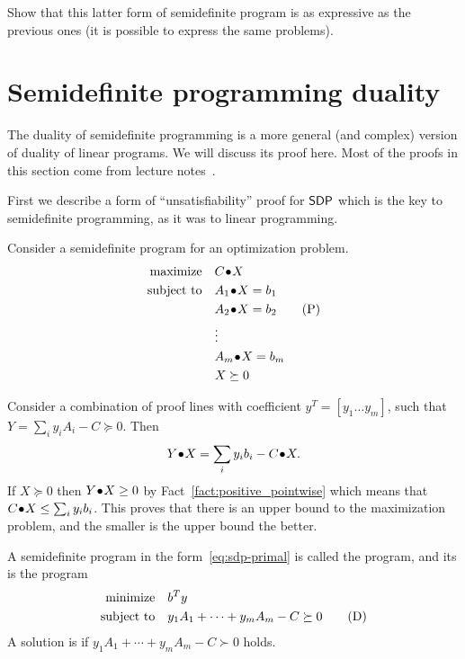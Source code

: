 \documentclass[a4paper,twoside,justified]{tufte-handout}
\begin{document}
\begin{exercise}
  Show that this latter form of semidefinite program is as expressive
  as the previous ones (\ie it is possible to express the same
  problems).
\end{exercise}

\section{Semidefinite programming duality}

The duality of semidefinite programming is a more general (and
complex) version of duality of linear programs. We will discuss its
proof here. Most of the proofs in this section come from \Lovasz
lecture notes~\cite{lovasz2003semidefinite}.


First we describe a form of ``unsatisfiability'' proof for $ \mathsf{SDP} $
which is the key to semidefinite programming, as it was to linear
programming.

Consider a semidefinite program for an optimization problem. 
\begin{alignat}{2}
  \maximize \pointwiseprod{C}{X} \notag\\
  \subjectto \pointwiseprod{A_{1}}{X} = b_{1} \notag\\
  & \pointwiseprod{A_{2}}{X} = b_{2} \label{eq:sdp-primal}\tag{P}\\
  & \vdots \notag\\
  & \pointwiseprod{A_{m}}{X} = b_{m} \notag\\
  & X \succeq 0 \notag
\end{alignat}

Consider a combination of proof lines with coefficient $ y^{T}=
[y_{1}\ldots y_{m}]$, such that $ Y= \sum_{i}y_{i}A_{i} - C \succeq
0$. Then 
\begin{equation}
 {Y}\!\bullet\!{X}=\sum_{i}y_{i}b_{i} -{C}\!\bullet\!{X}. 
\end{equation}
If $ X \succeq 0 $ then ${Y}\!\bullet\!{X} \geq 0$ by
Fact~\ref{fact:positive_pointwise} which means that $
{C}\!\bullet\!{X} \leq \sum_{i}y_{i}b_{i} $. This proves that there
is an upper bound to the maximization problem, and the smaller is the
upper bound the better.

\begin{definition}
  A semidefinite program in the form~\eqref{eq:sdp-primal} is called
  the  program, and its  is the program
  \begin{alignat}{2}
    \minimize  b^{T}y \notag \\
    \subjectto  y_{1}A_{1}+\cdots+y_{m}A_{m} -C \succeq
    0 \label{eq:sdp-dual} \tag{D}
  \end{alignat}
  A solution is  if
  $  y_{1}A_{1}+\cdots+y_{m}A_{m} -C \succ 0 $ holds.
\end{definition}
\end{document}
